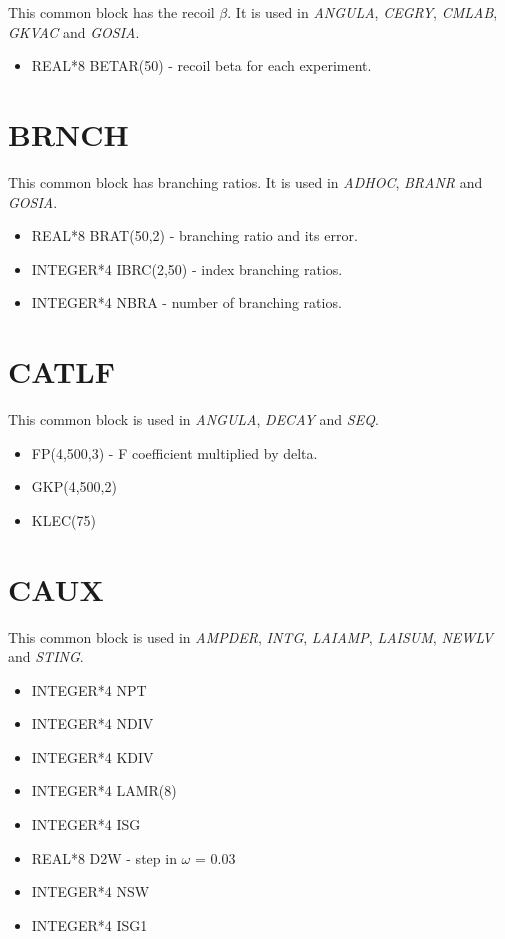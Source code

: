 This common block has the recoil $\beta$. It is used in {\em ANGULA}, {\em
CEGRY}, {\em CMLAB}, {\em GKVAC} and {\em GOSIA}.

\begin{itemize}
\item REAL*8 BETAR(50) - recoil beta for each experiment.
\end{itemize}

\section{BRNCH}

This common block has branching ratios. It is used in {\em ADHOC}, {\em
BRANR} and {\em GOSIA}.

\begin{itemize}
\item REAL*8 BRAT(50,2) - branching ratio and its error.
\item INTEGER*4 IBRC(2,50) - index branching ratios.
\item INTEGER*4 NBRA - number of branching ratios.
\end{itemize}

\section{CATLF}

This common block is used in {\em ANGULA}, {\em DECAY} and {\em SEQ}.

\begin{itemize}
\item FP(4,500,3) - F coefficient multiplied by delta.
\item GKP(4,500,2)
\item KLEC(75)
\end{itemize}

\section{CAUX}

This common block is used in {\em AMPDER}, {\em INTG}, {\em LAIAMP}, {\em
LAISUM}, {\em NEWLV} and {\em STING}.

\begin{itemize}
\item INTEGER*4 NPT
\item INTEGER*4 NDIV
\item INTEGER*4 KDIV
\item INTEGER*4 LAMR(8)
\item INTEGER*4 ISG
\item REAL*8 D2W - step in $\omega$ = 0.03
\item INTEGER*4 NSW
\item INTEGER*4 ISG1
\end{itemize}

